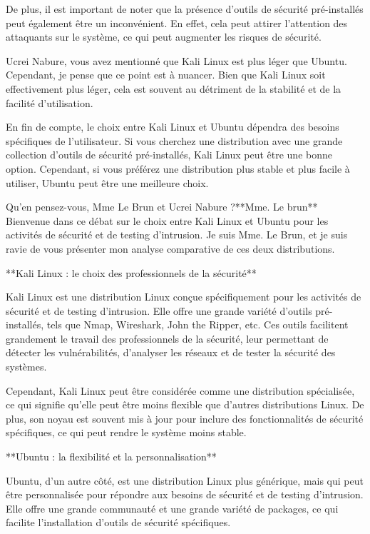 De plus, il est important de noter que la présence d'outils de sécurité pré-installés peut également être un inconvénient. En effet, cela peut attirer l'attention des attaquants sur le système, ce qui peut augmenter les risques de sécurité.

Ucrei Nabure, vous avez mentionné que Kali Linux est plus léger que Ubuntu. Cependant, je pense que ce point est à nuancer. Bien que Kali Linux soit effectivement plus léger, cela est souvent au détriment de la stabilité et de la facilité d'utilisation.

En fin de compte, le choix entre Kali Linux et Ubuntu dépendra des besoins spécifiques de l'utilisateur. Si vous cherchez une distribution avec une grande collection d'outils de sécurité pré-installés, Kali Linux peut être une bonne option. Cependant, si vous préférez une distribution plus stable et plus facile à utiliser, Ubuntu peut être une meilleure choix.

Qu'en pensez-vous, Mme Le Brun et Ucrei Nabure ?**Mme. Le brun**
Bienvenue dans ce débat sur le choix entre Kali Linux et Ubuntu pour les activités de sécurité et de testing d'intrusion. Je suis Mme. Le Brun, et je suis ravie de vous présenter mon analyse comparative de ces deux distributions.

**Kali Linux : le choix des professionnels de la sécurité**

Kali Linux est une distribution Linux conçue spécifiquement pour les activités de sécurité et de testing d'intrusion. Elle offre une grande variété d'outils pré-installés, tels que Nmap, Wireshark, John the Ripper, etc. Ces outils facilitent grandement le travail des professionnels de la sécurité, leur permettant de détecter les vulnérabilités, d'analyser les réseaux et de tester la sécurité des systèmes.

Cependant, Kali Linux peut être considérée comme une distribution spécialisée, ce qui signifie qu'elle peut être moins flexible que d'autres distributions Linux. De plus, son noyau est souvent mis à jour pour inclure des fonctionnalités de sécurité spécifiques, ce qui peut rendre le système moins stable.

**Ubuntu : la flexibilité et la personnalisation**

Ubuntu, d'un autre côté, est une distribution Linux plus générique, mais qui peut être personnalisée pour répondre aux besoins de sécurité et de testing d'intrusion. Elle offre une grande communauté et une grande variété de packages, ce qui facilite l'installation d'outils de sécurité spécifiques.

